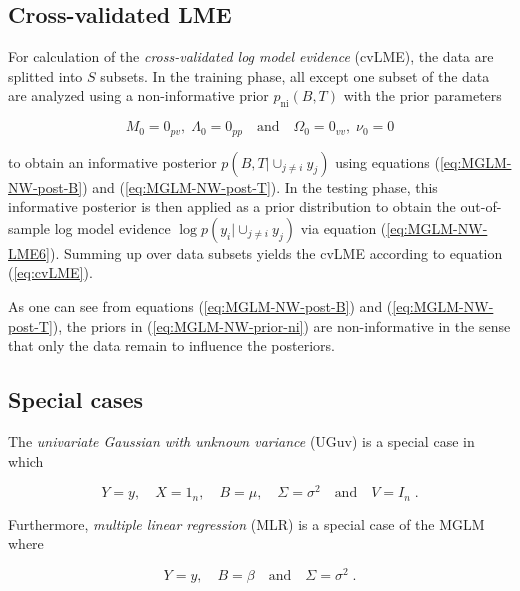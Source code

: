 \subsection{Cross-validated LME} \label{sec:MGLM-NW-cvLME}

For calculation of the \textit{cross-validated log model evidence} (cvLME), the data are splitted into $S$ subsets. In the training phase, all except one subset of the data are analyzed using a non-informative prior $p_\mathrm{ni}(B,T)$ with the prior parameters

\begin{equation} \label{eq:MGLM-NW-prior-ni}
M_0 = 0_{pv}, \; \Lambda_0 = 0_{pp} \quad \text{and} \quad \Omega_0 = 0_{vv}, \; \nu_0 = 0
\end{equation}

to obtain an informative posterior $p(B,T|\cup_{j \neq i} y_j)$ using equations (\ref{eq:MGLM-NW-post-B}) and (\ref{eq:MGLM-NW-post-T}). In the testing phase, this informative posterior is then applied as a prior distribution to obtain the out-of-sample log model evidence $\log p(y_i|\cup_{j \neq i} y_j)$ via equation (\ref{eq:MGLM-NW-LME6}). Summing up over data subsets yields the cvLME according to equation (\ref{eq:cvLME}).

As one can see from equations (\ref{eq:MGLM-NW-post-B}) and (\ref{eq:MGLM-NW-post-T}), the priors in (\ref{eq:MGLM-NW-prior-ni}) are non-informative in the sense that only the data remain to influence the posteriors.


\subsection{Special cases} \label{sec:MGLM-NW-Spec}

The \textit{univariate Gaussian with unknown variance} (UGuv) is a special case in which

\begin{equation} \label{eq:MGLM-NW-UGuv}
Y = y, \quad X = 1_n, \quad B = \mu, \quad \Sigma = \sigma^2 \quad \text{and} \quad V = I_n \; .
\end{equation}

Furthermore, \textit{multiple linear regression} (MLR) is a special case of the MGLM where

\begin{equation} \label{eq:MGLM-NW-MLR}
Y = y, \quad B = \beta \quad \text{and} \quad \Sigma = \sigma^2 \; .
\end{equation}

